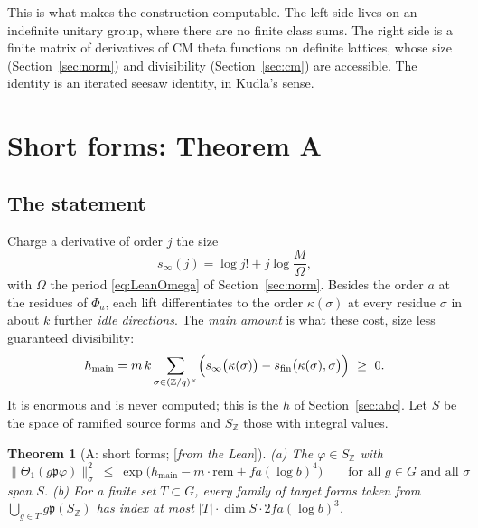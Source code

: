 \documentclass[11pt]{amsart}
\numberwithin{equation}{section}
\newtheorem{theorem}{Theorem}[section]
\theoremstyle{definition}
\theoremstyle{remark}
\newcommand{\Z}{\mathbb Z}
\newcommand{\status}[1]{\textup{[\emph{#1}]}}
\begin{document}
This is what makes the construction computable. The left side lives on an indefinite unitary group, where there are no finite class sums. The right side is a finite matrix of derivatives of CM theta functions on definite lattices, whose size (Section~\ref{sec:norm}) and divisibility (Section~\ref{sec:cm}) are accessible. The identity is an iterated seesaw identity, in Kudla's sense.

\section{Short forms: Theorem A}\label{sec:thmA}

\subsection*{The statement}
Charge a derivative of order $j$ the size
\begin{equation}\label{eq:sinfty}
 s_\infty(j)=\log j!+j\log\frac M\Omega,
\end{equation}
with $\Omega$ the period \eqref{eq:LeanOmega} of Section~\ref{sec:norm}. Besides the order $a$ at the residues of $\Phi_a$, each lift differentiates to the order $\kappa(\sigma)$ at every residue $\sigma$ in about $k$ further \emph{idle directions}. The \emph{main amount} is what these cost, size less guaranteed divisibility:
\begin{equation}\label{eq:hmain}
 h_{\mathrm{main}}=m\,k\sum_{\sigma\in(\Z/q)^\times}\Bigl(s_\infty\bigl(\kappa(\sigma)\bigr)-s_{\mathrm{fin}}\bigl(\kappa(\sigma),\sigma\bigr)\Bigr)\ \ge\ 0.
\end{equation}
It is enormous and is never computed; this is the $h$ of Section~\ref{sec:abc}. Let $S$ be the space of ramified source forms and $S_\Z$ those with integral values.

\begin{theorem}[A: short forms; \status{from the Lean}]\label{thm:A}
\emph{(a)} The $\varphi\in S_\Z$ with
\begin{equation}
 \bigl\|\Theta_1(g\mathfrak p\varphi)\bigr\|_\sigma^2\ \le\ \exp\bigl(h_{\mathrm{main}}-m\cdot\mathrm{rem}+fa(\log b)^4\bigr)\qquad\text{for all }g\in G\text{ and all }\sigma
\end{equation}
span $S$. \emph{(b)} For a finite set $T\subset G$, every family of target forms taken from $\bigcup_{g\in T}g\mathfrak p(S_\Z)$ has index at most $|T|\cdot\dim S\cdot2fa(\log b)^3$.
\end{theorem}
\end{document}
